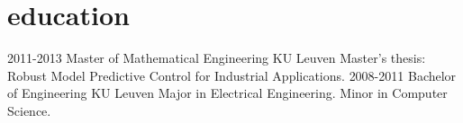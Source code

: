 \documentclass[]{twentysecondcv}
\begin{document}



\makeprofile



\section{education}

\begin{twenty}
  \twentyitem
    {2011-2013}
    {Master of Mathematical Engineering}
    {KU Leuven}
    {Master's thesis: Robust Model Predictive Control for Industrial Applications.}
  \twentyitem
    {2008-2011}
    {Bachelor of Engineering}
    {KU Leuven}
    {Major in Electrical Engineering. Minor in Computer Science.} 
\end{twenty}
\end{document}
